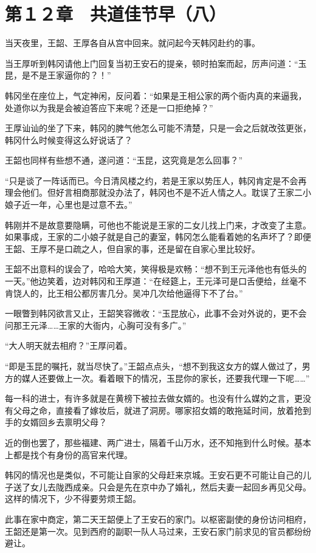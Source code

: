\section{第１２章　共道佳节早（八）}

当天夜里，王韶、王厚各自从宫中回来。就问起今天韩冈赴约的事。

当王厚听到韩冈请他上门回复当初王安石的提亲，顿时拍案而起，厉声问道：“玉昆，是不是王家逼你的？！”

韩冈坐在座位上，气定神闲，反问着：“如果是王相公家的两个衙内真的来逼我，处道你以为我是会被迫答应下来呢？还是一口拒绝掉？”

王厚讪讪的坐了下来，韩冈的脾气他怎么可能不清楚，只是一会之后就改弦更张，韩冈什么时候变得这么好说话了？

王韶也同样有些想不通，遂问道：“玉昆，这究竟是怎么回事？”

“只是谈了一阵话而已。今日清风楼之约，若是王家以势压人，韩冈肯定是不会再理会他们。但好言相商那就没办法了，韩冈也不是不近人情之人。耽误了王家二小娘子近一年，心里也是过意不去。”

韩刚并不是故意要隐瞒，可他也不能说是王家的二女儿找上门来，才改变了主意。如果事成，王家的二小娘子就是自己的妻室，韩冈怎么能看着她的名声坏了？即便王韶、王厚不是口疏之人，但自家的事，还是留在自家心里比较好。

王韶不出意料的误会了，哈哈大笑，笑得极是欢畅：“想不到王元泽他也有低头的一天。”他边笑着，边对韩冈和王厚道：“在经筵上，王元泽可是口舌便给，丝毫不肯饶人的，比王相公都厉害几分。吴冲几次给他逼得下不了台。”

一眼瞥到韩冈欲言又止，王韶笑容微收：“玉昆放心，此事不会对外说的，更不会问那王元泽……王家的大衙内，心胸可没有多广。”

“大人明天就去相府？”王厚问着。

“即是玉昆的嘱托，就当尽快了。”王韶点点头，“想不到我这女方的媒人做过了，男方的媒人还要做上一次。看着眼下的情况，玉昆你的家长，还要我代理一下呢……”

每一科的进士，有许多就是在黄榜下被拉去做女婿的。也没有什么媒妁之言，更没有父母之命，直接看了嫁妆后，就进了洞房。哪家招女婿的敢拖延时间，放着抢到手的女婿回乡去禀明父母？

近的倒也罢了，那些福建、两广进士，隔着千山万水，还不知拖到什么时候。基本上都是找个有身份的高官来代理。

韩冈的情况也是类似，不可能让自家的父母赶来京城。王安石更不可能让自己的儿子送了女儿去陇西成亲。只会是先在京中办了婚礼，然后夫妻一起回乡再见父母。这样的情况下，少不得要劳烦王韶。

此事在家中商定，第二天王韶便上了王安石的家门。以枢密副使的身份访问相府，王韶还是第一次。见到西府的副职一队人马过来，王安石家门前求见的官员都纷纷避让。

